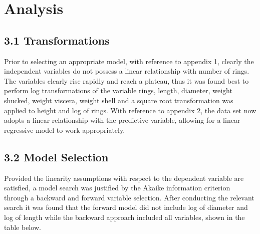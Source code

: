 \documentclass[letterpaper,9pt,twocolumn,twoside,]{pinp}
\begin{document}
\hypertarget{analysis}{%
\section{Analysis}\label{analysis}}

\hypertarget{transformations}{%
\subsection{3.1 Transformations}\label{transformations}}

Prior to selecting an appropriate model, with reference to appendix 1,
clearly the independent variables do not possess a linear relationship
with number of rings. The variables clearly rise rapidly and reach a
plateau, thus it was found best to perform log transformations of the
variable rings, length, diameter, weight shucked, weight viscera, weight
shell and a square root transformation was applied to height and log of
rings. With reference to appendix 2, the data set now adopts a linear
relationship with the predictive variable, allowing for a linear
regressive model to work appropriately.

\hypertarget{model-selection}{%
\subsection{3.2 Model Selection}\label{model-selection}}

Provided the linearity assumptions with respect to the dependent
variable are satisfied, a model search was justified by the Akaike
information criterion through a backward and forward variable selection.
After conducting the relevant search it was found that the forward model
did not include log of diameter and log of length while the backward
approach included all variables, shown in the table below.
\end{document}
